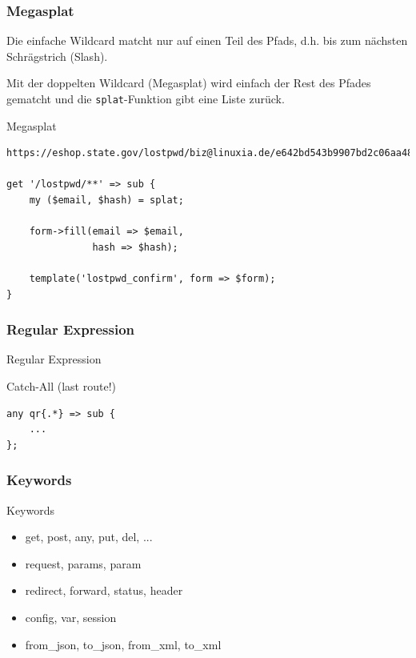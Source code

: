 \subsubsection{Megasplat}
Die einfache Wildcard matcht nur auf einen Teil des Pfads,
d.h. bis zum nächsten Schrägstrich (Slash).

Mit der doppelten Wildcard (Megasplat) wird einfach der 
Rest des Pfades gematcht und die \verb|splat|-Funktion
gibt eine Liste zurück.

\begin{frame}[fragile]{Megasplat}
\begin{lstlisting}
https://eshop.state.gov/lostpwd/biz@linuxia.de/e642bd543b9907bd2c06aa485261cb1a849a9f23fc7324bff45ebd35f4efe2cb

get '/lostpwd/**' => sub {
    my ($email, $hash) = splat;

    form->fill(email => $email,
               hash => $hash);
    
    template('lostpwd_confirm', form => $form);
}
\end{lstlisting}
\end{frame}

\subsubsection{Regular Expression}

\begin{frame}[fragile]{Regular Expression}

Catch-All (last route!)

\begin{lstlisting}
any qr{.*} => sub {
    ...
};
\end{lstlisting}
\end{frame}

\subsubsection{Keywords}
\begin{frame}[fragile]{Keywords}
\begin{itemize}
\item get, post, any, put, del, ...
\item request, params, param
\item redirect, forward, status, header
\item config, var, session
\item from\_json, to\_json, from\_xml, to\_xml
\end{itemize}
\end{frame}


